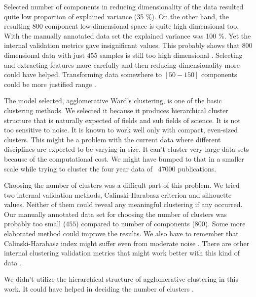 Selected number of components in reducing dimensionality of the 
data resulted quite low proportion of explained variance (35 \%).
On the other hand, the resulting $800$ component low-dimensional
space is quite high dimensional too.
With the manually annotated data set the explained variance was 
100 \%. Yet the internal validation metrics gave insignificant 
values. This probably shows that $800$ dimensional data with just 
$455$ samples is still too high dimensional \cite{aggarwal_surprising_2001}. 
Selecting and extracting features more carefully and then reducing
dimensionality more could have helped.
Transforming data somewhere to $[50-150]$ components could be more
justified range \cite{dolnicar_review_2002}. 

The model selected, agglomerative Ward's clustering, is one of the
basic clustering methods. We selected it because it produces 
hierarchical cluster structure that is naturally expected of fields
and sub fields of science. It is not too sensitive to noise.
It is known to work well only with compact, even-sized clusters.
This might be a problem with the current data where different 
disciplines are expected to be varying in size.
It can't cluster very large data sets because of the computational
cost. We might have bumped to that in a smaller scale while trying 
to cluster the four year data of ~47000 publications.

Choosing the number of clusters was a difficult part of this 
problem. We tried two internal validation methods,
Calinski-Harabasz criterion and silhouette values. Neither of them
could reveal any meaningful clustering if any occurred.
Our manually annotated data set for choosing the number of clusters
was probably too small ($455$) compared to number of components 
($800$). Some more elaborated method could improve the results. 
We also have to remember that Calinski-Harabasz index might suffer
even from moderate noise \cite{liu_understanding_2010}.
There are other internal clustering validation metrics that might 
work better with this kind of data \cite{liu_understanding_2010}.

We didn't utilize the hierarchical structure of agglomerative 
clustering in this work. 
It could have helped in deciding the number of clusters \cite{kimes_statistical_2017}.


